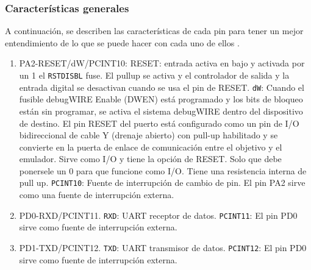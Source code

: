 \subsubsection*{Características generales}
A continuación, se describen las características de cada pin para tener un mejor entendimiento de lo que se puede hacer con cada uno de ellos \cite{web}.
\begin{enumerate}
\item PA2-RESET/dW/PCINT10: RESET: entrada activa en bajo y activada por un 1 el \texttt{RSTDISBL} fuse. El pullup se activa y el controlador de salida y la entrada digital se desactivan cuando se usa el pin de RESET. \texttt{dW}: Cuando el fusible debugWIRE Enable (DWEN) está programado y los bits de bloqueo están sin programar, se activa el sistema debugWIRE dentro del dispositivo de destino. El pin RESET del puerto está configurado como un pin de I/O bidireccional de cable Y (drenaje abierto) con pull-up habilitado y se convierte en la puerta de enlace de comunicación entre el objetivo y el emulador. Sirve como I/O y tiene la opción de RESET. Solo que debe ponersele un 0 para que funcione como I/O. Tiene una resistencia interna de pull up. \texttt{PCINT10}: Fuente de interrupción de cambio de pin. El pin PA2 sirve como una fuente de interrupción externa.

\item PD0-RXD/PCINT11. \texttt{RXD}: UART receptor de datos. \texttt{PCINT11}: El pin PD0 sirve como fuente de interrupción externa.

\item PD1-TXD/PCINT12. \texttt{TXD}: UART transmisor de datos. \texttt{PCINT12}: El pin PD0 sirve como fuente de interrupción externa.


\end{enumerate}
